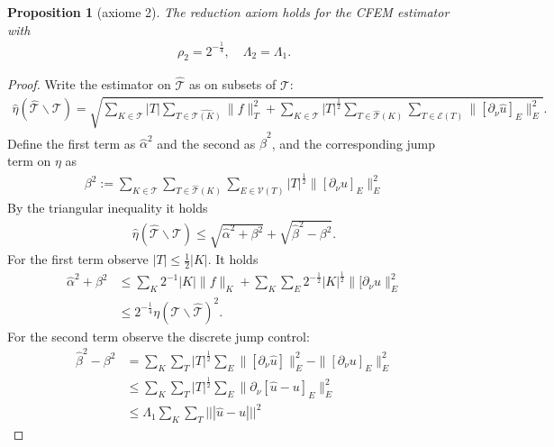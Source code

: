 \documentclass[a4paper,12pt,oneside,fleqn]{book}
\newtheorem{proposition}[theorem]{Proposition}
\theoremstyle{definition}
\theoremstyle{remark}
\begin{document}
\begin{proposition}[axiome 2]
	The reduction axiom holds for the CFEM estimator with 
	\begin{align*}
		\rho_2 = 2^{-\frac{1}{4}}, \quad \Lambda_2 = \Lambda_1.
	\end{align*}
\end{proposition}
\begin{proof}
	Write the estimator on $\hat{\mathcal{T}}$ as on subsets of $\mathcal{T}$:
	\begin{align*}
		\hat{\eta}(\hat{\mathcal{T}}\backslash \mathcal{T}) = \sqrt{ \sum_{K \in \mathcal{T}} |T| \sum_{T \in \hat{\mathcal{T}(K)}} \|f\|_T^2 + \sum_{K \in \mathcal{T}} |T|^{\frac{1}{2}} \sum_{T \in \hat{\mathcal{T}}(K)} \sum_{T \in \mathcal{E}(T)} \| [\partial_\nu \hat{u}]_E\|_E^2}.
	\end{align*}
	Define the first term as $\hat{\alpha}^2$ and the second as $\hat{\beta}^2$, and the corresponding jump term on $\eta$ as
	\begin{align*}
		\beta^2:= \sum_{K \in \mathcal{T}} \sum_{T \in \hat{\mathcal{T}}(K)} \sum_{E \in \mathcal{V}(T)} |T|^{\frac{1}{2}} \|[\partial_\nu u]_E\|_E^2 
	\end{align*}
	By the triangular inequality it holds
	\begin{align*}
		\hat{\eta}(\hat{\mathcal{T}} \backslash\mathcal{T}) \le \sqrt{ \hat{\alpha}^2 + \beta^2 } + \sqrt{\hat{\beta}^2 - \beta^2}. 
	\end{align*}
	For the first term observe $|T| \le \frac{1}{2}|K|$. It holds
	\begin{align*}
		\hat{\alpha}^2 + \beta^2 &\le \sum_K 2^{-1}|K|  \|f\|_K + \sum_K \sum_E 2^{-\frac{1}{2}}
		 |K|^\frac{1}{2}\|[\partial_\nu u\|_E^2\\
		& \le 2^{-\frac{1}{4}} \eta(\mathcal{T} \backslash \hat{\mathcal{T}})^2. 
	\end{align*}
	For the second term observe the discrete jump control:
	\begin{align*}
		\hat{\beta}^2 - \beta^2 &= \sum_K \sum_T |T|^{\frac{1}{2}}\sum_E \|[\partial_\nu \hat{u}]\|_E^2 - \|[\partial_\nu u]_E\|_E^2 \\
		&\le \sum_K \sum_T |T|^\frac{1}{2} \sum_E \| \partial_\nu [\hat{u} -  u]_E\|^2_E\\
		&\le \Lambda_1 \sum_K \sum_T |||\hat{u} - u|||^2 
	\end{align*}
\end{proof}
\end{document}
